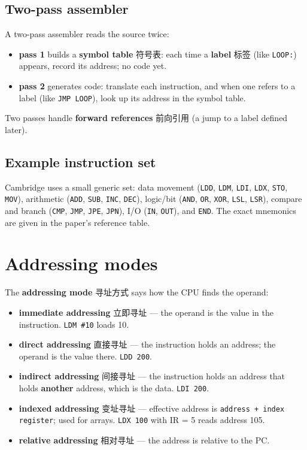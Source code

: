 \documentclass[11pt]{article}
\begin{document}
\subsection*{Two-pass assembler}

A two-pass assembler reads the source twice:

\begin{itemize}
\item \textbf{pass 1} builds a \textbf{symbol table} 符号表: each time a \textbf{label} 标签 (like \texttt{LOOP:}) appears, record its address; no code yet.

\item \textbf{pass 2} generates code: translate each instruction, and when one refers to a label (like \texttt{JMP LOOP}), look up its address in the symbol table.

\end{itemize}

Two passes handle \textbf{forward references} 前向引用 (a jump to a label defined later).

\subsection*{Example instruction set}

Cambridge uses a small generic set: data movement (\texttt{LDD}, \texttt{LDM}, \texttt{LDI}, \texttt{LDX}, \texttt{STO}, \texttt{MOV}), arithmetic (\texttt{ADD}, \texttt{SUB}, \texttt{INC}, \texttt{DEC}), logic/bit (\texttt{AND}, \texttt{OR}, \texttt{XOR}, \texttt{LSL}, \texttt{LSR}), compare and branch (\texttt{CMP}, \texttt{JMP}, \texttt{JPE}, \texttt{JPN}), I/O (\texttt{IN}, \texttt{OUT}), and \texttt{END}. The exact mnemonics are given in the paper's reference table.

\section*{Addressing modes}

The \textbf{addressing mode} 寻址方式 says how the CPU finds the operand:

\begin{itemize}
\item \textbf{immediate addressing} 立即寻址 — the operand is the value in the instruction. \texttt{LDM \#10} loads 10.

\item \textbf{direct addressing} 直接寻址 — the instruction holds an address; the operand is the value there. \texttt{LDD 200}.

\item \textbf{indirect addressing} 间接寻址 — the instruction holds an address that holds \textbf{another} address, which is the data. \texttt{LDI 200}.

\item \textbf{indexed addressing} 变址寻址 — effective address is \texttt{address + index register}; used for arrays. \texttt{LDX 100} with IR = 5 reads address 105.

\item \textbf{relative addressing} 相对寻址 — the address is relative to the PC.

\end{itemize}
\end{document}
